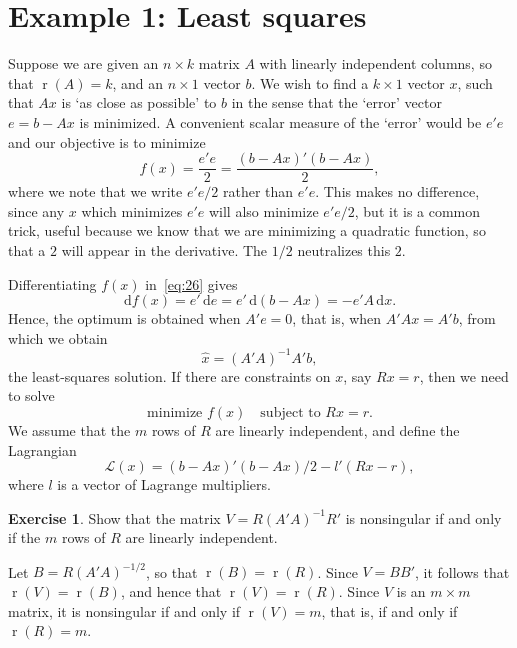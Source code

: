 \documentclass[12pt,a4paper]{article}
\makeatletter
\theoremstyle{definition}
\newtheorem{exercise}{Exercise}
\renewenvironment{proof}[1][\proofname]{\par
  \pushQED{\qed}%
  \normalfont \topsep6\p@\@plus6\p@\relax
  \trivlist
  \item[\hskip\labelsep\bfseries #1\@addpunct{.}]\ignorespaces
}{%
  \popQED\endtrivlist\@endpefalse
}
\newenvironment{solution}{%
  \begin{proof}[Solution]%
}{%
  \end{proof}%
}
\DeclareMathOperator{\rank}{r}
\newcommand{\dd}{\mathrm{d}}
\makeatother
\begin{document}
\section{Example 1: Least squares}\label{sec:6}

Suppose we are given an $n \times k$ matrix $A$ with linearly independent columns, so that $\rank(A) = k$, and an $n \times 1$ vector $b$. We wish to find a $k \times 1$ vector $x$, such that $Ax$ is `as close as possible' to $b$ in the sense that the `error' vector $e = b - Ax$ is minimized. A convenient scalar measure of the `error' would be $e'e$ and our objective is to minimize
\begin{equation}\label{eq:26}
f(x) = \frac{e'e}{2} = \frac{(b - Ax)'(b - Ax)}{2},
\end{equation}
where we note that we write $e'e/2$ rather than $e'e$. This makes no difference, since any $x$ which minimizes $e'e$ will also minimize $e'e/2$, but it is a common trick, useful because we know that we are minimizing a quadratic function, so that a $2$ will appear in the derivative. The $1/2$ neutralizes this $2$. %

Differentiating $f(x)$ in~\eqref{eq:26} gives
\[
\dd f(x) = e'\, \dd e = e'\, \dd(b - Ax) = -e'A\, \dd x.
\]
Hence, the optimum is obtained when $A'e = 0$, that is, when $A'Ax = A'b$, from which we obtain
\begin{equation}\label{eq:27}
\hat{x} = (A'A)^{-1} A'b,
\end{equation}
the least-squares solution. %
If there are constraints on $x$, say $Rx = r$, then we need to solve
\begin{equation}\label{eq:28}
\text{minimize } f(x) \quad \text{subject to } Rx = r.
\end{equation}
We assume that the $m$ rows of $R$ are linearly independent, and define the Lagrangian
\[
\mathcal{L}(x) = (b - Ax)'(b - Ax)/2 - l'(Rx - r),
\]
where $l$ is a vector of Lagrange multipliers. %

\begin{exercise}\label{exer:17}
Show that the matrix $V = R(A'A)^{-1}R'$ is nonsingular if and only if the $m$ rows of $R$ are linearly independent.
\end{exercise}

\begin{solution}
Let $B = R(A'A)^{-1/2}$, so that $\rank(B) = \rank(R)$. Since $V = BB'$, it follows that $\rank(V) = \rank(B)$, and hence that $\rank(V) = \rank(R)$. Since $V$ is an $m \times m$ matrix, it is nonsingular if and only if $\rank(V) = m$, that is, if and only if $\rank(R) = m$. %
\end{solution}
\end{document}
